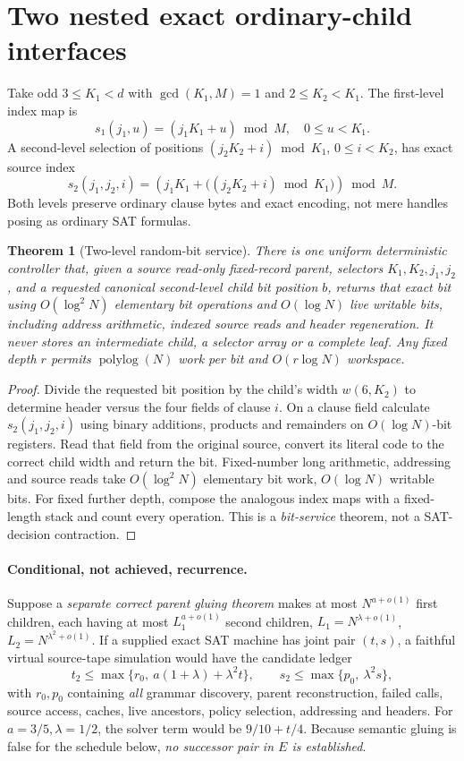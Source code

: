 \documentclass[11pt]{article}
\newtheorem{theorem}{Theorem}
\begin{document}
\section{Two nested exact ordinary-child interfaces}
Take odd \(3\le K_1<d\) with \(\gcd(K_1,M)=1\) and \(2\le K_2<K_1\). The first-level index map is
\[
s_1(j_1,u)=(j_1K_1+u)\bmod M,\quad 0\le u<K_1.
\]
A second-level selection of positions \((j_2K_2+i)\bmod K_1\), \(0\le i<K_2\), has exact source index
\[
\boxed{s_2(j_1,j_2,i)=
\left(j_1K_1+\big((j_2K_2+i)\bmod K_1\big)\right)\bmod M.}
\]
Both levels preserve ordinary clause bytes and exact encoding, not mere handles posing as ordinary SAT formulas.

\begin{theorem}[Two-level random-bit service]\label{thm:bits}
There is one uniform deterministic controller that, given a source read-only fixed-record parent, selectors \(K_1,K_2,j_1,j_2\), and a requested canonical second-level child bit position \(b\), returns that exact bit using \(O(\log^2 N)\) elementary bit operations and \(O(\log N)\) live writable bits, including address arithmetic, indexed source reads and header regeneration. It never stores an intermediate child, a selector array or a complete leaf. Any fixed depth \(r\) permits \(\operatorname{polylog}(N)\) work per bit and \(O(r\log N)\) workspace.
\end{theorem}
\begin{proof}
Divide the requested bit position by the child's width \(w(6,K_2)\) to determine header versus the four fields of clause \(i\). On a clause field calculate \(s_2(j_1,j_2,i)\) using binary additions, products and remainders on \(O(\log N)\)-bit registers. Read that field from the original source, convert its literal code to the correct child width and return the bit. Fixed-number long arithmetic, addressing and source reads take \(O(\log^2N)\) elementary bit work, \(O(\log N)\) writable bits. For fixed further depth, compose the analogous index maps with a fixed-length stack and count every operation. This is a \emph{bit-service} theorem, not a SAT-decision contraction.
\end{proof}

\paragraph{Conditional, not achieved, recurrence.}
Suppose a \emph{separate correct parent gluing theorem} makes at most \(N^{a+o(1)}\) first children, each having at most \(L_1^{a+o(1)}\) second children, \(L_1=N^{\lambda+o(1)}\), \(L_2=N^{\lambda^2+o(1)}\). If a supplied exact SAT machine has joint pair \((t,s)\), a faithful virtual source-tape simulation would have the candidate ledger
\[
t_2\le\max\{r_0,\ a(1+\lambda)+\lambda^2t\},\qquad
s_2\le\max\{p_0,\ \lambda^2s\},
\]
with \(r_0,p_0\) containing \emph{all} grammar discovery, parent reconstruction, failed calls, source access, caches, live ancestors, policy selection, addressing and headers. For \(a=3/5,\lambda=1/2\), the solver term would be \(9/10+t/4\). Because semantic gluing is false for the schedule below, \emph{no successor pair in \(E\) is established}.
\end{document}

